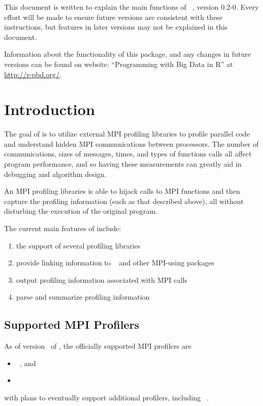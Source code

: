 This document is written to explain the main
functions of ~\citep{Chen2013pbdPROFpackage}, version 0.2-0.
Every effort will be made to ensure future versions are consistent with
these instructions, but features in later versions may not be explained
in this document.

Information about the functionality of this package,
and any changes in future versions can be found on website:
``Programming with Big Data in R'' at
\url{http://r-pbd.org/}.



\section{Introduction}
\label{sec:introduction}

The goal of  is to utilize external MPI profiling libraries
to profile parallel  code and understand hidden MPI
communications between processors. The number of communications,
sizes of messages, times, and types of functions calls all affect program
performance, and so having these measurements can greatly aid in debugging and 
algorithm design. 

An MPI profiling libraries is able to
hijack calls to MPI functions and then capture the profiling information 
(such as that described above), all without disturbing the execution of the original program.

The current main features of  include:
\begin{enumerate}
  \item the support of several profiling libraries
  \item provide linking information to ~\citep{pbdR2012} and other MPI-using  packages
  \item output profiling information associated with MPI calls
  \item parse and summarize profiling information
\end{enumerate}



\subsection{Supported MPI Profilers}

As of version \profversion\ of , the officially supported MPI profilers are
\begin{itemize}
  \item {}~\citep{fpmpi}, and
  \item {}~\citep{mpiP}
\end{itemize}
with plans to eventually support additional profilers, including ~\citep{TAU}.




